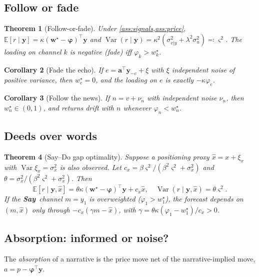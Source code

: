 \documentclass{article}
\theoremstyle{plain}
\newtheorem{theorem}{Theorem}[section]
\newtheorem{corollary}[theorem]{Corollary}
\theoremstyle{definition}
\theoremstyle{remark}
\newcommand{\E}{\mathbb{E}}
\newcommand{\w}{\bm{w}}
\newcommand{\y}{\bm{y}}
\newcommand{\bphi}{\bm{\varphi}}
\DeclareMathOperator{\Var}{Var}
\newcommand{\SAY}{\textcolor{say}{\textsf{\textbf{Say}}}}
\begin{document}
\subsection{Follow or fade}

\begin{theorem}[Follow-or-fade]\label{thm:followfade}
Under \cref{ass:signals,ass:price}, $\E[r\mid\y]=\kappa(\w^\star-\bphi)^\top\y$ and $\Var(r\mid\y)=\kappa^2(\sigma^2_{v|y}+\lambda^2\sigma_u^2)\eqqcolon\varsigma^2$. The loading on channel $k$ is negative (\emph{fade}) iff $\varphi_k>w^\star_k$.
\end{theorem}

\begin{corollary}[Fade the echo]\label{cor:echo}
If $e=\bm a^\top\y_{-e}+\xi$ with $\xi$ independent noise of positive variance, then $w^\star_e=0$, and the loading on $e$ is exactly $-\kappa\varphi_e$.
\end{corollary}

\begin{corollary}[Follow the news]\label{cor:news}
If $n=v+\nu_n$ with independent noise $\nu_n$, then $w^\star_n\in(0,1)$, and returns drift with $n$ whenever $\varphi_n<w^\star_n$.
\end{corollary}

\subsection{Deeds over words}

\begin{theorem}[Say--Do gap optimality]\label{thm:saydo}
Suppose a positioning proxy $\hat x=x+\xi_x$ with $\Var\xi_x=\sigma_x^2$ is also observed. Let $c_x=\beta\varsigma^2/(\beta^2\varsigma^2+\sigma_x^2)$ and $\theta=\sigma_x^2/(\beta^2\varsigma^2+\sigma_x^2)$. Then
\[
  \E[r\mid\y,\hat x]=\theta\kappa(\w^\star-\bphi)^\top\y+c_x\hat x,\quad \Var(r\mid\y,\hat x)=\theta\varsigma^2 .
\]
If the \SAY\ channel $m=y_1$ is overweighted ($\varphi_1>w^\star_1$), the forecast depends on $(m,\hat x)$ only through $-c_x(\gamma m-\hat x)$, with $\gamma=\theta\kappa(\varphi_1-w^\star_1)/c_x>0$.
\end{theorem}

\subsection{Absorption: informed or noise?}\label{sec:absorption}

The \emph{absorption} of a narrative is the price move net of the narrative-implied move, $a=p-\bphi^\top\y$.
\end{document}
